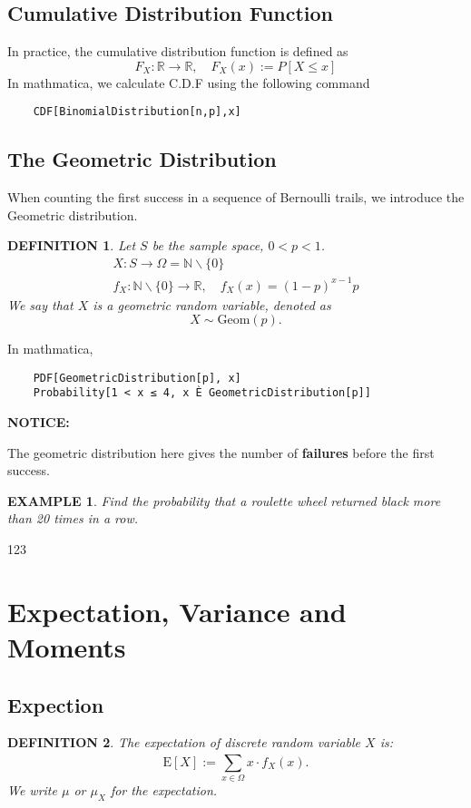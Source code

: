 \documentclass[11pt,a4paper]{article}
\newtheorem*{example}{\bf EXAMPLE}
\newtheorem*{definition}{\bf DEFINITION}
\begin{document}
\subsection{Cumulative Distribution Function}
In practice, the cumulative distribution function is defined as
\[F_X:\mathbb{R}\rightarrow\mathbb{R}, \quad
    F_X(x):=P[X\le x]\]
In mathmatica, we calculate C.D.F using the following command
\begin{verbatim}
    CDF[BinomialDistribution[n,p],x]
\end{verbatim}

\subsection{The Geometric Distribution}
\label{Geom}
When counting the first success in a sequence of Bernoulli trails,
we introduce the Geometric distribution.
\begin{definition}
    Let $S$ be the sample space, $0<p<1$.
    \begin{gather*}
        X: S\rightarrow\varOmega = \mathbb{N} \backslash \{0\} \\
        f_X:\mathbb{N}\backslash \{0\}\rightarrow\mathbb{R},
        \quad f_X(x)=(1-p)^{x-1}p
    \end{gather*}
    We say that $X$ is a geometric random variable, denoted as
    \[X\sim \mathrm{Geom}(p).\]
\end{definition}
In mathmatica,
\begin{verbatim}
    PDF[GeometricDistribution[p], x]
    Probability[1 < x ≤ 4, x È GeometricDistribution[p]]
\end{verbatim}
{\bf\color[RGB]{255,0,0}NOTICE:}

The geometric distribution here
gives the number of {\bf\color[RGB]{255,0,0}failures} before the first success.
\begin{example}
    Find the probability that a roulette wheel returned black more than 20 times in a
    row.
\end{example}



123

\section{Expectation, Variance and Moments}
\subsection{Expection}
\begin{definition}
    The expectation of discrete random variable $X$ is:
    \[\mathrm{E}[X]:=\sum_{x\in\varOmega}^{}x\cdot f_X(x).\]
    We write $\mu$ or $\mu_X$ for the expectation.
\end{definition}
\end{document}
